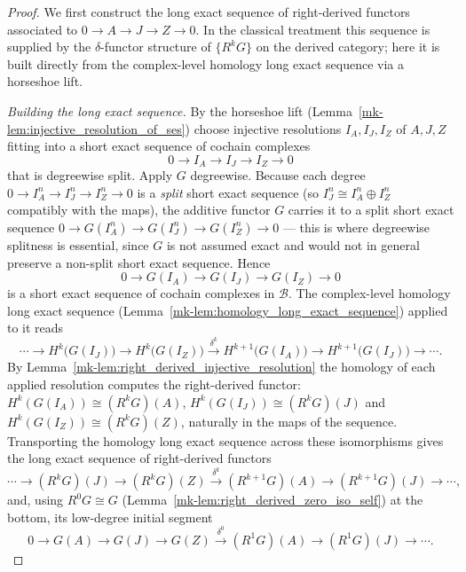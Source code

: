 \begin{proof}
  \leanok
    We first construct the long exact sequence of right-derived functors associated
  to \(0 \to A \to J \to Z \to 0\). In the classical treatment this sequence is
  supplied by the \(\delta\)-functor structure of \(\{R^k G\}\) on the derived
  category; here it is built directly from the complex-level homology long exact
  sequence via a horseshoe lift.

  \emph{Building the long exact sequence.} By the horseshoe lift
  (Lemma~\ref{mk-lem:injective_resolution_of_ses}) choose injective resolutions
  \(I_A, I_J, I_Z\) of \(A, J, Z\) fitting into a short exact sequence of cochain
  complexes
  \[
    0 \longrightarrow I_A \longrightarrow I_J \longrightarrow I_Z \longrightarrow 0
  \]
  that is degreewise split. Apply \(G\) degreewise. Because each degree
  \(0 \to I_A^n \to I_J^n \to I_Z^n \to 0\) is a \emph{split} short exact sequence
  (so \(I_J^n \cong I_A^n \oplus I_Z^n\) compatibly with the maps), the additive
  functor \(G\) carries it to a split short exact sequence
  \(0 \to G(I_A^n) \to G(I_J^n) \to G(I_Z^n) \to 0\) --- this is where degreewise
  splitness is essential, since \(G\) is not assumed exact and would not in general
  preserve a non-split short exact sequence. Hence
  \[
    0 \longrightarrow G(I_A) \longrightarrow G(I_J) \longrightarrow G(I_Z)
      \longrightarrow 0
  \]
  is a short exact sequence of cochain complexes in \(\mathcal{B}\). The
  complex-level homology long exact sequence
  (Lemma~\ref{mk-lem:homology_long_exact_sequence}) applied to it reads
  \[
    \cdots \to H^k\bigl(G(I_J)\bigr) \to H^k\bigl(G(I_Z)\bigr)
      \xrightarrow{\ \delta^k\ } H^{k+1}\bigl(G(I_A)\bigr)
      \to H^{k+1}\bigl(G(I_J)\bigr) \to \cdots .
  \]
  By Lemma~\ref{mk-lem:right_derived_injective_resolution} the homology of each applied
  resolution computes the right-derived functor:
  \(H^k(G(I_A)) \cong (R^k G)(A)\), \(H^k(G(I_J)) \cong (R^k G)(J)\) and
  \(H^k(G(I_Z)) \cong (R^k G)(Z)\), naturally in the maps of the sequence. Transporting
  the homology long exact sequence across these isomorphisms gives the long exact
  sequence of right-derived functors
  \[
    \cdots \to (R^k G)(J) \to (R^k G)(Z)
      \xrightarrow{\ \delta^k\ } (R^{k+1} G)(A) \to (R^{k+1} G)(J) \to \cdots,
  \]
  and, using \(R^0 G \cong G\) (Lemma~\ref{mk-lem:right_derived_zero_iso_self}) at the
  bottom, its low-degree initial segment
  \[
    0 \to G(A) \to G(J) \to G(Z)
      \xrightarrow{\ \delta^0\ } (R^1 G)(A) \to (R^1 G)(J) \to \cdots .
  \]


\end{proof}
